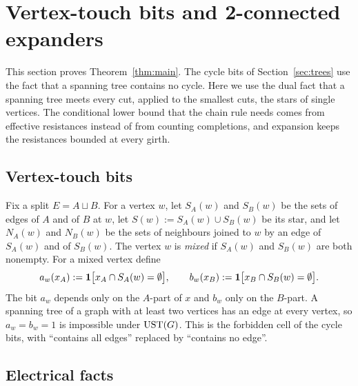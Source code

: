 \section{Vertex-touch bits and 2-connected expanders}\label{sec:vertex}

This section proves Theorem~\ref{thm:main}. The cycle bits of Section~\ref{sec:trees} use the fact that a spanning tree contains no cycle. Here we use the dual fact that a spanning tree meets every cut, applied to the smallest cuts, the stars of single vertices. The conditional lower bound that the chain rule needs comes from effective resistances instead of from counting completions, and expansion keeps the resistances bounded at every girth.

\subsection{Vertex-touch bits}

Fix a split $E=A\sqcup B$. For a vertex $w$, let $S_A(w)$ and $S_B(w)$ be the sets of edges of $A$ and of $B$ at $w$, let $S(w):=S_A(w)\cup S_B(w)$ be its star, and let $N_A(w)$ and $N_B(w)$ be the sets of neighbours joined to $w$ by an edge of $S_A(w)$ and of $S_B(w)$. The vertex $w$ is \emph{mixed} if $S_A(w)$ and $S_B(w)$ are both nonempty. For a mixed vertex define
\[
  a_w(x_A):=\mathbf{1}\bigl[x_A\cap S_A(w)=\emptyset\bigr],\qquad b_w(x_B):=\mathbf{1}\bigl[x_B\cap S_B(w)=\emptyset\bigr].
\]
The bit $a_w$ depends only on the $A$-part of $x$ and $b_w$ only on the $B$-part. A spanning tree of a graph with at least two vertices has an edge at every vertex, so $a_w=b_w=1$ is impossible under $\mathrm{UST}(G)$. This is the forbidden cell of the cycle bits, with ``contains all edges'' replaced by ``contains no edge''.

\subsection{Electrical facts}

